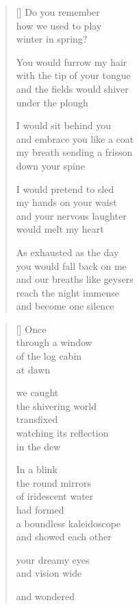 \documentclass[12pt,a4paper]{article}
\begin{document}
\begin{verse}[\versewidth]
  Do you remember \\
  how we used to play \\
  winter in spring?

  You would furrow my hair \\
  with the tip of your tongue \\
  and the fields would shiver \\
  under the plough

  I would sit behind you \\
  and embrace you like a coat \\
  my breath sending a frisson \\
  down your spine

  I would pretend to sled \\
  my hands on your waist \\
  and your nervous laughter \\
  would melt my heart

  As exhausted as the day \\
  you would fall back on me \\
  and our breaths like geysers \\
  reach the night immense \\
  and become one silence
\end{verse}


\newpage

\poemtitle{}

\settowidth{\versewidth}{the infinite kaleidoscope}

\bigskip

\begin{verse}[\versewidth]
  Once \\
  through a window \\
  of the log cabin \\
  at dawn

  we caught \\
  the shivering world \\
  transfixed \\
  watching its reflection \\
  in the dew

  In a blink \\
  the round mirrors \\
  of iridescent water \\
  had formed \\
  a boundless kaleidoscope \\
  and showed each other

  your dreamy eyes \\
  and vision wide

  and wondered
\end{verse}
\end{document}
